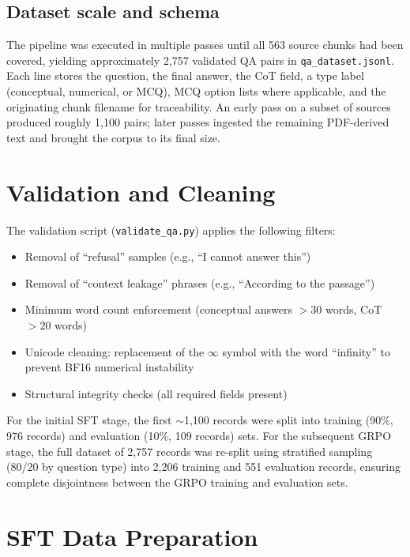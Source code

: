 \documentclass[12pt]{report}
\begin{document}
\subsection{Dataset scale and schema}

The pipeline was executed in multiple passes until all 563 source chunks had been covered, yielding approximately 2,757 validated QA pairs in \texttt{qa\_dataset.jsonl}. Each line stores the question, the final answer, the CoT field, a type label (conceptual, numerical, or MCQ), MCQ option lists where applicable, and the originating chunk filename for traceability. An early pass on a subset of sources produced roughly 1,100 pairs; later passes ingested the remaining PDF-derived text and brought the corpus to its final size.

\section{Validation and Cleaning}

The validation script (\texttt{validate\_qa.py}) applies the following filters:

\begin{itemize}
    \item Removal of ``refusal'' samples (e.g., ``I cannot answer this'')
    \item Removal of ``context leakage'' phrases (e.g., ``According to the passage'')
    \item Minimum word count enforcement (conceptual answers $> 30$ words, CoT $> 20$ words)
    \item Unicode cleaning: replacement of the $\infty$ symbol with the word ``infinity'' to prevent BF16 numerical instability
    \item Structural integrity checks (all required fields present)
\end{itemize}

For the initial SFT stage, the first $\sim$1,100 records were split into training (90\%, 976 records) and evaluation (10\%, 109 records) sets. For the subsequent GRPO stage, the full dataset of 2,757 records was re-split using stratified sampling (80/20 by question type) into 2,206 training and 551 evaluation records, ensuring complete disjointness between the GRPO training and evaluation sets.

\section{SFT Data Preparation}
\end{document}
